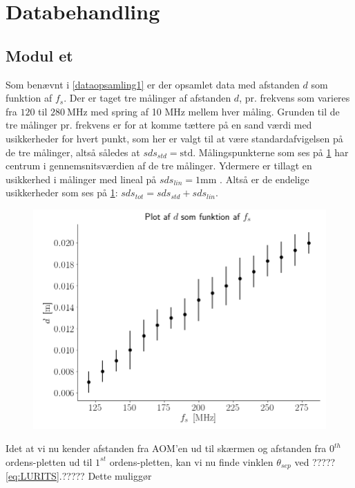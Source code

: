 \documentclass[main]{subfiles}
\begin{document}
\section{Databehandling}
\subsection{Modul et}
Som benævnt i \cref{dataopsamling1} er der opsamlet data med afstanden $d$ som funktion af $f_s$. Der er taget tre målinger af afstanden $d$, pr. frekvens som varieres fra $120$ til $280 \ \si{\mega\hertz}$ med spring af 10 $\si{\mega\hertz}$ mellem hver måling. Grunden til de tre målinger pr. frekvens er for at komme tættere på en sand værdi med usikkerheder for hvert punkt, som her er valgt til at være standardafvigelsen på de tre målinger, altså således at $sds_{std} = \text{std}$. Målingspunkterne som ses på \cref{fig:rawdata_modul1} har centrum i gennemsnitsværdien af de tre målinger. Ydermere er tillagt en usikkerhed i målinger med lineal på
$ sds_{lin} = 1 \si{\milli\meter} $ . Altså er de endelige usikkerheder som ses på \cref{fig:rawdata_modul1}:  $ sds_{tot} = sds_{std} + sds_{lin} $.
\begin{figure}[H]
    \centering
    \includegraphics[width=\linewidth]{tegninger/rawdata_modul1.png}
    \caption{}
    \label{fig:rawdata_modul1}
\end{figure}
Idet at vi nu kender afstanden fra AOM'en ud til skærmen og afstanden fra $0^{th}$ ordens-pletten ud til $1^{st}$ ordens-pletten, kan vi nu finde vinklen $\theta_{sep}$ ved ?????\cref{eq:LURITS}.?????%
Dette muliggør 
\end{document}
